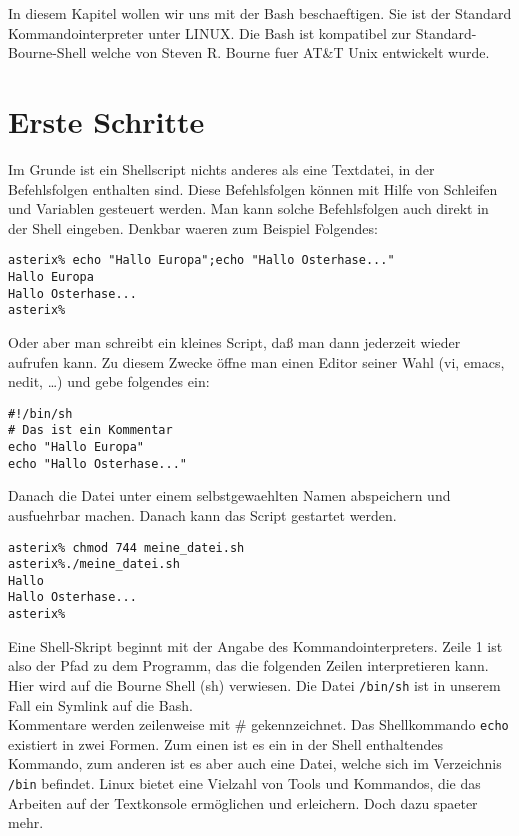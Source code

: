 \documentclass[12pt,]{article}
\begin{document}
In diesem Kapitel wollen wir uns mit der Bash beschaeftigen. Sie ist der
Standard Kommandointerpreter unter LINUX. Die Bash ist kompatibel zur
Standard-Bourne-Shell welche von Steven R. Bourne fuer AT\&T Unix
entwickelt wurde.

\section{Erste Schritte}\label{erste-schritte}

Im Grunde ist ein Shellscript nichts anderes als eine Textdatei, in der
Befehlsfolgen enthalten sind. Diese Befehlsfolgen können mit Hilfe von
Schleifen und Variablen gesteuert werden. Man kann solche Befehlsfolgen
auch direkt in der Shell eingeben. Denkbar waeren zum Beispiel
Folgendes:

\begin{verbatim}
asterix% echo "Hallo Europa";echo "Hallo Osterhase..."
Hallo Europa
Hallo Osterhase...
asterix%
\end{verbatim}

Oder aber man schreibt ein kleines Script, daß man dann jederzeit wieder
aufrufen kann. Zu diesem Zwecke öffne man einen Editor seiner Wahl (vi,
emacs, nedit, \ldots{}) und gebe folgendes ein:

\begin{verbatim}
#!/bin/sh
# Das ist ein Kommentar
echo "Hallo Europa"
echo "Hallo Osterhase..."
\end{verbatim}

Danach die Datei unter einem selbstgewaehlten Namen abspeichern und
ausfuehrbar machen. Danach kann das Script gestartet werden.

\begin{verbatim}
asterix% chmod 744 meine_datei.sh
asterix%./meine_datei.sh
Hallo 
Hallo Osterhase...
asterix%
\end{verbatim}

Eine Shell-Skript beginnt mit der Angabe des Kommandointerpreters. Zeile
1 ist also der Pfad zu dem Programm, das die folgenden Zeilen
interpretieren kann. Hier wird auf die Bourne Shell (sh) verwiesen. Die
Datei \texttt{/bin/sh} ist in unserem Fall ein Symlink auf die Bash.\\
Kommentare werden zeilenweise mit \# gekennzeichnet. Das Shellkommando
\texttt{echo} existiert in zwei Formen. Zum einen ist es ein in der
Shell enthaltendes Kommando, zum anderen ist es aber auch eine Datei,
welche sich im Verzeichnis \texttt{/bin} befindet. Linux bietet eine
Vielzahl von Tools und Kommandos, die das Arbeiten auf der Textkonsole
ermöglichen und erleichern. Doch dazu spaeter mehr.
\end{document}
